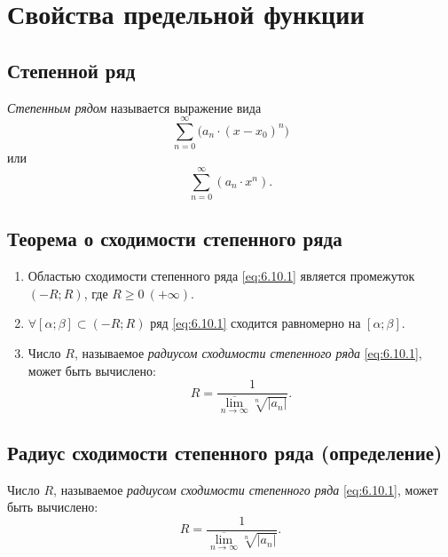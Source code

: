 \section{Свойства предельной функции}

\setcounter{subsection}{93}

\subsection{Степенной ряд}

\begin{definition}
    \emph{Степенным рядом} называется выражение вида
    \[
        \sum_{n=0}^{\infty}\big(a_n\cdot (x-x_0)^n\big)
    \]
    или
    \begin{equation}\label{eq:6.10.1}
        \sum_{n=0}^{\infty}(a_n \cdot x^n).
    \end{equation}
\end{definition}

\subsection{Теорема о сходимости степенного ряда}

\begin{theorem}\label{theorem:6.10.1}\leavevmode
    \begin{enumerate}
        \item Областью сходимости степенного ряда \ref{eq:6.10.1} является промежуток $(-R;R)$, где $R \geqslant 0 \ (+ \infty)$.
        \item $\forall [\alpha;\beta] \subset (-R;R)$ ряд \ref{eq:6.10.1} сходится равномерно на $[\alpha;\beta]$.
        \item Число $R$, называемое \emph{радиусом сходимости степенного ряда} \ref{eq:6.10.1}, может быть вычислено:
              \[
                  R = \frac{1}{\underset{n\rightarrow\infty}{\overline{\lim}}\sqrt[n]{|a_n|}}.
              \]
    \end{enumerate}
\end{theorem}

\subsection{Радиус сходимости степенного ряда (определение)}

\begin{definition}
    Число $R$, называемое \emph{радиусом сходимости степенного ряда} \ref{eq:6.10.1}, может быть вычислено:
    \[
        R = \frac{1}{\underset{n\rightarrow\infty}{\overline{\lim}}\sqrt[n]{|a_n|}}.
    \]
\end{definition}

